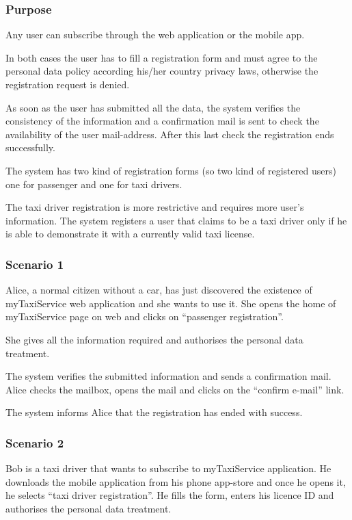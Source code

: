 \label{user-registration}
\subsubsection{Purpose}
Any user can subscribe through the web application or the mobile app.

In both cases the user has to fill a registration form and must agree to the personal data policy according his/her country privacy laws, otherwise the registration request is denied.

As soon as the user has submitted all the data, the system verifies the consistency of the information and a confirmation mail is sent to check the availability of the user mail-address.  After this last check the registration ends successfully.

The system has two kind of registration forms (so two kind of registered users) one for passenger and one for taxi drivers.

The taxi driver registration is more restrictive and requires more user's information.
The system registers a user that claims to be a taxi driver only if he is able to demonstrate it with a currently valid taxi license.

\subsubsection{Scenario 1}
Alice, a normal citizen without a car, has just discovered the existence of myTaxiService web application and she wants to use it.
She opens the home of myTaxiService page on web and clicks on ``passenger registration''.

She gives all the information required and authorises the personal data treatment.

The system verifies the submitted information and sends a confirmation mail.
Alice checks the mailbox, opens the mail and clicks on the ``confirm e-mail'' link.

The system informs Alice that the registration has ended with success.

\subsubsection{Scenario 2}
Bob is a taxi driver that wants to subscribe to myTaxiService application.
He downloads the mobile application from his phone app-store and once he opens it, he selects ``taxi driver registration''.
He fills the form, enters his licence ID and authorises the personal data treatment.

